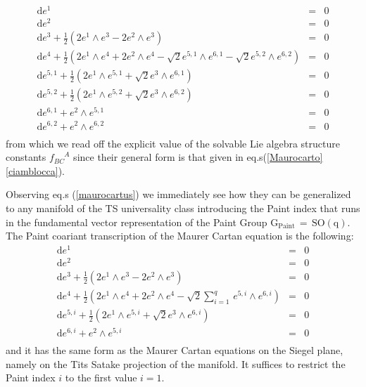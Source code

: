 \documentclass[10pt,a4paper]{article}
\begin{document}
\begin{equation}\label{maurocartus}
\begin{array}{lcl}
 \mathrm{d}e^1 & = & 0 \\
 \mathrm{d}e^2 & = & 0 \\
 \mathrm{d}e^3+\frac{1}{2} (2 e^{1}\wedge e^{3}-2 e^{2}\wedge e^{3}) & = & 0 \\
 \mathrm{d}e^4+\frac{1}{2} \left(2 e^{1}\wedge e^{4}+2 e^{2}\wedge e^{4}-\sqrt{2} e^{5,1}\wedge
   e^{6,1}-\sqrt{2} e^{5,2}\wedge e^{6,2}\right) & = & 0 \\
 \mathrm{d}e^{5,1}+\frac{1}{2} \left(2 e^{1}\wedge e^{5,1}+\sqrt{2} e^{3}\wedge e^{6,1}\right) & = & 0 \\
 \mathrm{d}e^{5,2}+\frac{1}{2} \left(2 e^{1}\wedge e^{5,2}+\sqrt{2} e^{3}\wedge e^{6,2}\right) & = & 0 \\
 \mathrm{d}e^{6,1}+e^{2}\wedge e^{5,1} & = & 0 \\
 \mathrm{d}e^{6,2}+e^{2}\wedge e^{6,2} & = & 0 \\
\end{array}
\end{equation}
from which we read off the explicit value of the solvable Lie algebra structure constants $f^{\phantom{BC}A}_{BC}$ since their general form is that given in eq.s(\ref{Maurocarto}\ref{ciamblocca}).
\par
Observing eq.s (\ref{maurocartus}) we immediately see how they can be generalized to any manifold of the TS universality class introducing the Paint index that runs in the fundamental vector representation of the Paint Group
$\mathrm{G_{Paint}} \, = \, \mathrm{SO(q)}$. The Paint coariant transcription of the Maurer Cartan equation is the following:
\begin{equation}\label{maurocartus}
\begin{array}{lcl}
 \mathrm{d}e^1 & = & 0 \\
 \mathrm{d}e^2 & = & 0 \\
 \mathrm{d}e^3+\frac{1}{2} (2 e^{1}\wedge e^{3}-2 e^{2}\wedge e^{3}) & = & 0 \\
 \mathrm{d}e^4+\frac{1}{2} \left(2 e^{1}\wedge e^{4}+2 e^{2}\wedge e^{4}-\sqrt{2}
 \sum^{q}_{i=1} \, e^{5,i}\wedge e^{6,i}\right)& = & 0 \\
 \mathrm{d}e^{5,i}+\frac{1}{2} \left(2 e^{1}\wedge e^{5,i}+\sqrt{2} e^{3}\wedge e^{6,i}\right) & = & 0 \\
 \mathrm{d}e^{6,i}+e^{2}\wedge e^{5,i} & = & 0 \\
\end{array}
\end{equation}
and it has the same form as the Maurer Cartan equations on the Siegel plane, namely on the Tits Satake projection of the manifold. It suffices to restrict the Paint index $i$ to the first value $i=1$.
\end{document}
